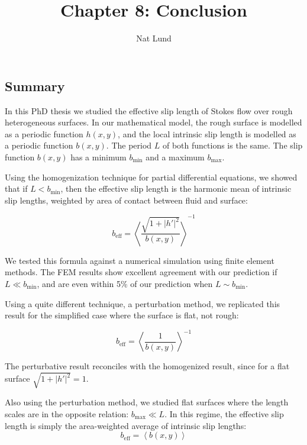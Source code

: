 \documentclass[a4paper]{report}
\title{Chapter 8: Conclusion}
\author{Nat Lund}
\newcommand{\beff}{\ensuremath{b_{\mathrm{eff}}}}
\newcommand{\bmin}{\ensuremath{b_{\mathrm{min}}}}
\newcommand{\bmax}{\ensuremath{b_{\mathrm{max}}}}
\begin{document}
\maketitle

\subsection*{Summary}

In this PhD thesis we studied the effective slip length of Stokes flow over rough heterogeneous surfaces.  In our mathematical model, the rough surface is modelled as a periodic function $h(x,y)$, and the local intrinsic slip length is modelled as a periodic function $b(x,y)$.  The period $L$ of both functions is the same.  The slip function $b(x,y)$ has a minimum $\bmin$ and a maximum $\bmax$.

Using the homogenization technique for partial differential equations, we showed that if $L < \bmin$, then the effective slip length is the harmonic mean of intrinsic slip lengths, weighted by area of contact between fluid and surface:

\begin{equation}
\beff = \left< \frac{\sqrt{1+ |h'|^2}}{b(x,y)} \right>^{-1}
\end{equation}

We tested this formula against a numerical simulation using finite element methods.  The FEM results show excellent agreement with our prediction if $L \ll \bmin$, and are even within 5\% of our prediction when $L \sim \bmin$.

\vspace*{1em}
Using a quite different technique, a perturbation method, we replicated this result for the simplified case where the surface is flat, not rough:

\begin{equation}
\beff = \left< \frac{1}{b(x,y)} \right>^{-1}
\end{equation}

The perturbative result reconciles with the homogenized result, since for a flat surface $\sqrt{1+ |h'|^2} = 1$.

Also using the perturbation method, we studied flat surfaces where the length scales are in the opposite relation: $\bmax \ll L$.  In this regime, the effective slip length is simply the area-weighted average of intrinsic slip lengths:
\begin{equation}
\beff = \left< b(x,y) \right>
\end{equation}
\end{document}
